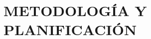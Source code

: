 \chapter[Metodología y planificación]{
  \label{chp:metodologia}
  METODOLOGÍA Y PLANIFICACIÓN
}
\thispagestyle{numberingStyle}
\pagestyle{numberingStyle}